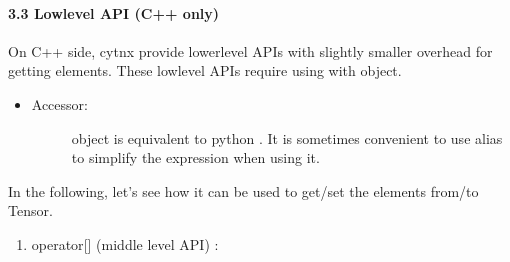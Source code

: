 \documentclass[letterpaper,10pt,english]{sphinxmanual}
\begin{document}
\paragraph{3.3 Low\sphinxhyphen{}level API (C++ only)}
\label{\detokenize{guide/basic_obj/Tensor_3_access:low-level-api-c-only}}
On C++ side, cytnx provide lower\sphinxhyphen{}level APIs with slightly smaller overhead for getting elements.
These low\sphinxhyphen{}level APIs require using with  object.
\begin{itemize}
\item {} \begin{description}
\item[{Accessor:}] \leavevmode
{} object is equivalent to python . It is sometimes convenient to use alias to simplify the expression when using it.

\begin{sphinxVerbatim}[commandchars=\\\{\},numbers=left,firstnumber=1,stepnumber=1]
     

         
     
     
\end{sphinxVerbatim}

\end{description}

\end{itemize}

In the following, let’s see how it can be used to get/set the elements from/to Tensor.
\begin{enumerate}
%
\item {} 
operator{[}{]} (middle level API) :

\end{enumerate}
\end{document}
